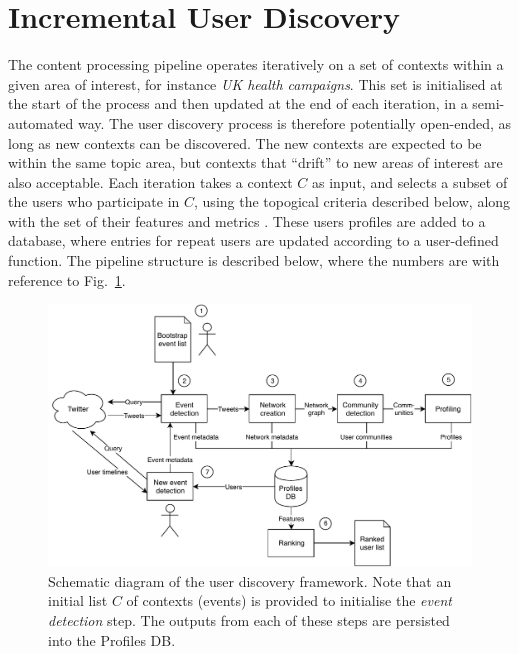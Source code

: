 \section{Incremental User Discovery} \label{sec:Pipeline}

The content processing pipeline operates iteratively on a set of contexts within a given area of interest, for instance \textit{UK health campaigns}. This set is initialised at the start of the process and then updated at the end of each iteration, in a semi-automated way. 
The user discovery process is therefore potentially open-ended, as long as new contexts can be discovered.
The new contexts are expected to be within the same topic area, but contexts that ``drift'' to new areas of interest are also acceptable. 
Each iteration takes a context $C$  as input, and selects a subset of the users who participate in $C$, using the topogical criteria described below, along with the  set of their features and metrics . 
These users profiles are added to a database, where entries for repeat users are updated according to a user-defined function. 
%
The pipeline structure is described below, where the numbers are with reference to Fig.~\ref{fig:twitterframework}.

\begin{figure}
	\centering
	\includegraphics[width=\textwidth]{figures/TwitterFramework}
	\caption{Schematic diagram of the user discovery framework. Note that an initial list $C$ of contexts (events) is provided to initialise the \textit{event detection} step. 
	The outputs from each of these steps are persisted into the Profiles DB.}
	\label{fig:twitterframework}
\end{figure}

